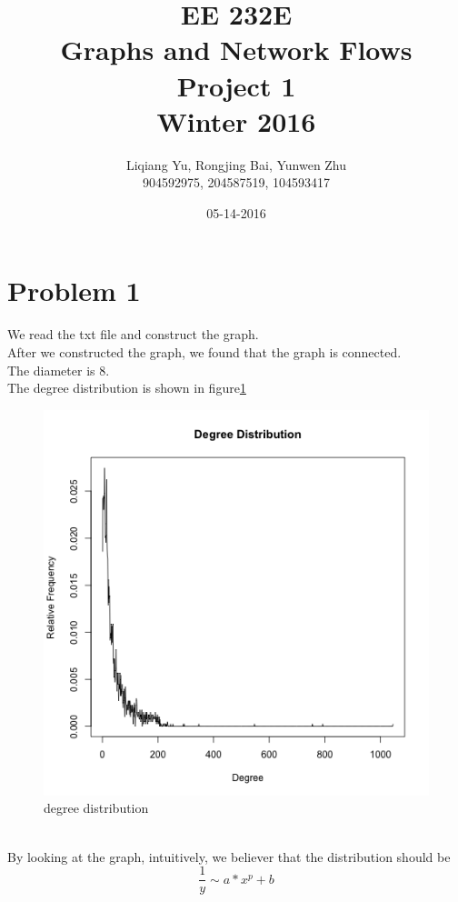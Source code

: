 \documentclass{article}
\begin{document}
\begin{titlepage}
\title{EE 232E \\Graphs and Network Flows\\Project 1\\Winter 2016} 
\author{Liqiang Yu, Rongjing Bai, Yunwen Zhu\\
904592975, 204587519, 104593417}  %
\date{05-14-2016}
\end{titlepage}
\maketitle
\newpage
\tableofcontents
\newpage
\section{Problem 1}
We read the txt file and construct the graph.\\
After we constructed the graph, we found that the graph is connected.\\
The diameter is 8.\\
The degree distribution is shown in figure\ref{fig:p1_1}
\begin{figure}[htbp]
\centering
\includegraphics[width=.8\textwidth]{1_1.png}
\caption{degree distribution}
\label{fig:p1_1}
\end{figure}\\
By looking at the graph, intuitively, we believer that the distribution should be $$\frac{1}{y} \sim a*x^{p}+b$$\\
\end{document}
